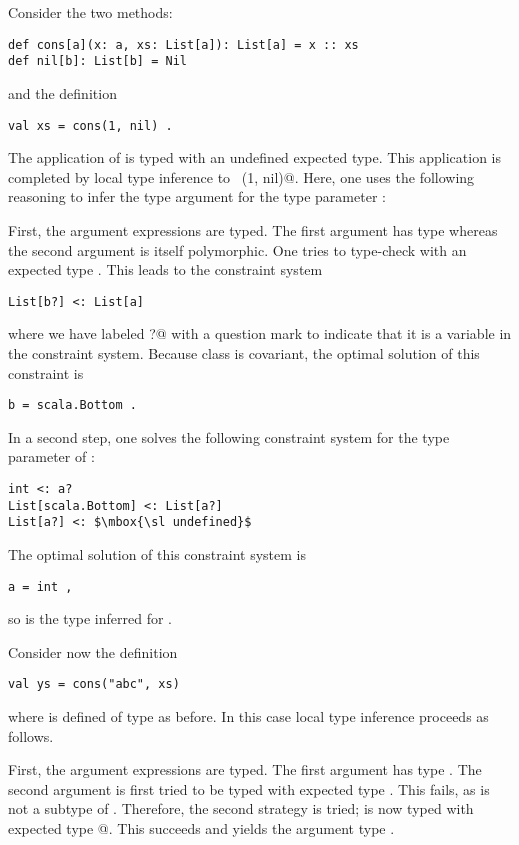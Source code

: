 \example Consider the two methods:
\begin{lstlisting}
def cons[a](x: a, xs: List[a]): List[a] = x :: xs
def nil[b]: List[b] = Nil
\end{lstlisting}
and the definition
\begin{lstlisting}
val xs = cons(1, nil) .
\end{lstlisting}
The application of  is typed with an undefined expected
type. This application is completed by local type inference to 
~\lstinline@cons[int](1, nil)@. 
Here, one uses the following
reasoning to infer the type argument \lstinline@int@ for the type
parameter :

First, the argument expressions are typed. The first argument 
has type  whereas the second argument \lstinline@nil@ is
itself polymorphic. One tries to type-check \lstinline@nil@ with an
expected type . This leads to the constraint system
\begin{lstlisting}
List[b?] <: List[a]
\end{lstlisting}
where we have labeled \lstinline@b?@ with a question mark to indicate
that it is a variable in the constraint system.
Because class \lstinline@List@ is covariant, the optimal
solution of this constraint is
\begin{lstlisting}
b = scala.Bottom .
\end{lstlisting}

In a second step, one solves the following constraint system for
the type parameter  of :
\begin{lstlisting}
int <: a?
List[scala.Bottom] <: List[a?]
List[a?] <: $\mbox{\sl undefined}$
\end{lstlisting}
The optimal solution of this constraint system is
\begin{lstlisting}
a = int ,
\end{lstlisting}
so  is the type inferred for .

\example Consider now the definition  
\begin{lstlisting}
val ys = cons("abc", xs)
\end{lstlisting}
where  is defined of type  as before.
In this case local type inference proceeds as follows.

First, the argument expressions are typed. The first argument
 has type . The second argument  is
first tried to be typed with expected type . This fails,
as  is not a subtype of . Therefore, 
the second strategy is tried;  is now typed with expected type
@. This succeeds and yields the argument type
.

